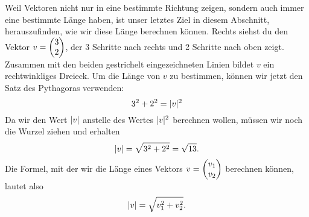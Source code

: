 \documentclass[../../main.tex]{subfiles}
\begin{document}
Weil Vektoren nicht nur in eine bestimmte Richtung zeigen, sondern auch immer eine bestimmte Länge haben, ist unser 
letztes Ziel in diesem Abschnitt, herauszufinden, wie wir diese Länge berechnen können. Rechts siehst du den Vektor 
$v=\begin{pmatrix} 3\\ 2 \end{pmatrix}$, der 3 Schritte nach rechts und 2 Schritte nach oben zeigt. Zusammen mit den beiden gestrichelt
eingezeichneten Linien bildet $v$ ein rechtwinkliges Dreieck. Um die Länge von $v$ zu bestimmen, können wir jetzt
den Satz des Pythagoras verwenden:
\[3^2+2^2=\lvert v\rvert^2\]
Da wir den Wert $\lvert v\rvert$ anstelle des Wertes $\lvert v\rvert^2$ berechnen wollen, müssen wir noch die Wurzel ziehen und erhalten
\[\lvert v\rvert=\sqrt{3^2+2^2}=\sqrt{13}.\]
Die Formel, mit der wir die Länge eines Vektors $v=\begin{pmatrix} v_1\\ v_2 \end{pmatrix}$ berechnen können, lautet also
\[\lvert v\rvert=\sqrt{v_1^2+v_2^2}.\]
\end{document}

